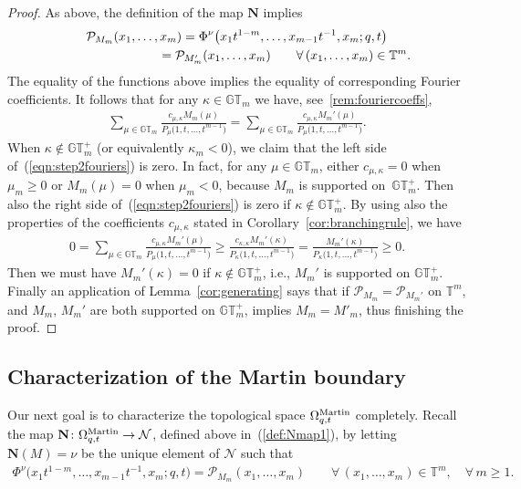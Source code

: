 \documentclass[pdftex]{sigma}
\numberwithin{equation}{section}
\newcommand{\Nu}{\mathcal{N}}
\newcommand{\GT}{\mathbb{GT}}
\newcommand{\GTp}{\mathbb{GT}^+}
\newcommand{\PPP}{\mathcal{P}}
\newcommand{\TT}{\mathbb{T}}
\newcommand{\Mart}{\Omega_{q, t}^{\rm Martin}}
\newcommand{\NN}{\mathbf{N}}
\begin{document}
\begin{proof}
As above, the def\/inition of the map $\NN$ implies
\begin{gather*}
\PPP_{M_m}(x_1, \dots, x_m) = \Phi^{\nu}\big(x_1t^{1-m}, \dots, x_{m-1}t^{-1}, x_m; q, t\big) \\
\hphantom{\PPP_{M_m}(x_1, \dots, x_m)}{} = \PPP_{M'_m}(x_1, \dots, x_m) \qquad \forall\, (x_1, \dots, x_m)\in\TT^m.
\end{gather*}
The equality of the functions above implies the equality of corresponding Fourier coef\/f\/icients.
It follows that for any $\kappa\in\GT_m$ we have, see~\eqref{rem:fouriercoeffs},
\begin{gather}\label{eqn:step2fouriers}
\sum_{\mu\in\GT_m}{\frac{c_{\mu, \kappa}M_m(\mu)}{P_{\mu}\big(1, t, \dots, t^{m-1}\big)}} = \sum_{\mu\in\GT_m}{\frac{c_{\mu, \kappa}M_m'(\mu)}{P_{\mu}\big(1, t, \dots, t^{m-1}\big)}}.
\end{gather}
When $\kappa\notin\GTp_m$ (or equivalently $\kappa_m < 0$), we claim that the left side of~(\ref{eqn:step2fouriers}) is zero. In fact, for any $\mu\in\GT_m$, either $c_{\mu, \kappa} = 0$ when $\mu_m \geq 0$ or $M_m(\mu) = 0$ when $\mu_m < 0$, because $M_m$ is supported on~$\GTp_m$.
Then also the right side of~(\ref{eqn:step2fouriers}) is zero if $\kappa\notin\GTp_m$. By using also the properties of the coef\/f\/icients $c_{\mu, \kappa}$ stated in Corollary~\ref{cor:branchingrule}, we have
\begin{gather*}
0 = \sum_{\mu\in\GT_m}{\frac{c_{\mu, \kappa}M_m'(\mu)}{P_{\mu}\big(1, t, \dots, t^{m-1}\big)}} \geq \frac{c_{\kappa, \kappa}M_m'(\kappa)}{P_{\kappa}\big(1, t, \dots, t^{m-1}\big)} = \frac{M_m'(\kappa)}{P_{\kappa}\big(1, t, \dots, t^{m-1}\big)} \geq 0.
\end{gather*}
Then we must have $M_m'(\kappa) = 0$ if $\kappa\notin\GTp_m$, i.e., $M_m'$ is supported on $\GTp_m$. Finally an application of Lemma~\ref{cor:generating} says that if $\PPP_{M_m} = \PPP_{M_m'}$ on $\TT^m$, and $M_m$, $M_m'$ are both supported on $\GTp_m$, implies $M_m = M'_m$, thus f\/inishing the proof.
\end{proof}

\subsection{Characterization of the Martin boundary}\label{sec:martinchar}

Our next goal is to characterize the topological space $\Mart$ completely.
Recall the map $\NN\colon \Mart \rightarrow \Nu$, def\/ined above in~(\ref{def:Nmap1}), by letting $\NN(M) = \nu$ be the unique element of $\Nu$ such that
\begin{gather*}
\Phi^{\nu}\big(x_1t^{1-m}, \dots, x_{m-1}t^{-1}, x_m; q, t\big) = \mathcal{P}_{M_m}(x_1, \dots, x_m)\! \qquad \forall\, (x_1, \dots, x_m) \in \TT^m,\! \quad \forall\, m\geq 1.
\end{gather*}
\end{document}
